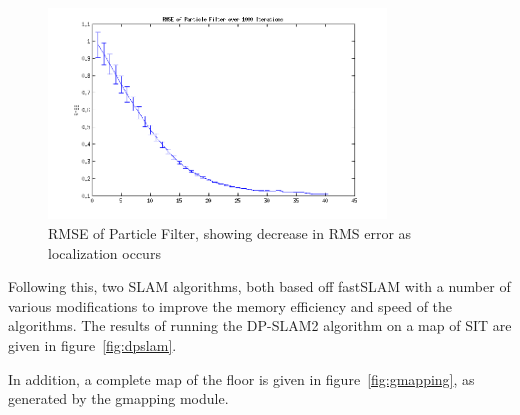 \documentclass[english]{article}
\begin{document}
\begin{figure}[htp]
\centering
 \includegraphics[width=0.8\textwidth]{images/particlefilterRMSE.png}
\caption{RMSE of Particle Filter, showing decrease in RMS error as localization occurs}
\label{fig:rmseparticle}
\end{figure}

Following this, two SLAM algorithms, both based off fastSLAM with a number of various modifications to improve the memory efficiency and speed of the algorithms. The results of running the DP-SLAM2 algorithm on a map of SIT are given in figure~\ref{fig:dpslam}.

In addition, a complete map of the floor is given in figure~\ref{fig:gmapping}, as generated by the gmapping module.
\end{document}
